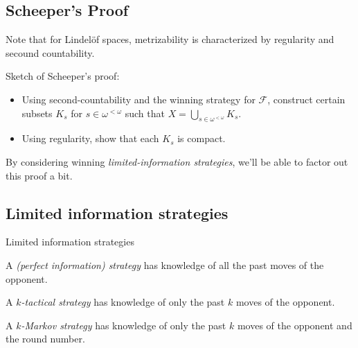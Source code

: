 \documentclass{beamer}
\theoremstyle{definition}
\newcommand{\<}{\langle}
\renewcommand{\>}{\rangle}
\newcommand{\pl}[1]{\mathscr{#1}}
\newcommand{\term}{\textit}
\begin{document}
\subsection{Scheeper's Proof}

\begin{frame}
  Note that for Lindel\"of spaces, metrizability is characterized by regularity
  and secound countability.

  \vpause

  Sketch of Scheeper's proof:
  \begin{itemize}
    \item Using second-countability and the winning strategy for $\pl F$,
          construct certain subsets $K_s$ for $s \in \omega^{<\omega}$ such
          that $X = \bigcup_{s\in\omega^{<\omega}}K_s$.
    \item Using regularity, show that each $K_s$ is compact.
  \end{itemize}

  \vpause

  By considering winning \term{limited-information strategies}, we'll be able
  to factor out this proof a bit.
\end{frame}

\subsection{Limited information strategies}

\begin{frame}{Limited information strategies}
  \begin{definition}
    A \term{(perfect information) strategy} has knowledge of all the past
    moves of the opponent.
  \end{definition}

  \pause

  \begin{definition}
    A \term{$k$-tactical strategy} has knowledge of only the past $k$
    moves of the opponent.
  \end{definition}

  \pause

  \begin{definition}
    A \term{$k$-Markov strategy} has knowledge of only the past $k$
    moves of the opponent and the round number.
  \end{definition}
\end{frame}
\end{document}
